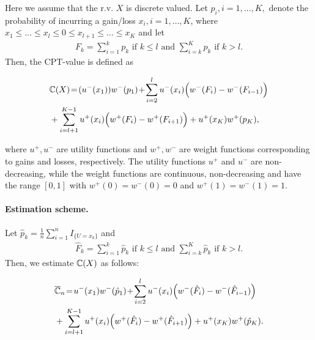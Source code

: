 Here we assume that the r.v. $X$ is discrete valued. 
Let $p_i, i=1,\ldots,K,$ denote the probability of incurring a gain/loss $x_i, i=1,\ldots,K$, where 
$x_1\le \ldots \le x_l \le 0 \le x_{l+1} \le \ldots \le x_K$ and  let
\begin{align}
\label{eq:Fk}
 F_k = 
   \sum_{i=1}^k p_k  \text{ if   } k \leq l \text{ and }
   \sum_{i=k}^K p_k  \text{ if  }  k > l.
\end{align}
Then, the CPT-value is defined as 
\begin{small}
\begin{align*}
&\mathbb{C}(X) \!=\! (u^-(x_1)) w^-(p_1) 
\!+\!\sum_{i=2}^l u^-(x_i) \Big(w^-(F_i) - w^-(F_{i-1})\Big) \\
& + \sum_{i=l+1}^{K-1} u^+(x_i) \Big(w^+(F_i) - w^+(F_{i+1}) \Big)
 + u^+(x_K) w^+(p_K),
\end{align*} 
\end{small}
where $u^+, u^-$ are utility functions and $w^+, w^-$ are weight functions corresponding to gains and losses, respectively. The utility functions $u^+$ and $u^-$ are non-decreasing, while the weight functions are continuous, non-decreasing and have the range $[0,1]$ with $w^+(0)=w^-(0)=0$ and $w^+(1)=w^-(1)=1$. 

\paragraph{Estimation scheme.} 
Let $\hat p_k= \frac{1}{n} \sum_{i=1}^n I_{\{U =x_k\}}$ and 
\begin{align}
\label{eq:Fkhat}
 \hat F_k = 
   \sum_{i=1}^k \hat p_k  \text{ if   } k \leq l \text{ and }
   \sum_{i=k}^K \hat p_k  \text{ if  }  k > l.
\end{align}
Then, we estimate $\mathbb{C}(X)$ as follows:
\begin{small}
\begin{align*}
&\overline {\mathbb{C}}_n \!=\! 
u^-(x_1) w^-(\hat p_1) \!+\!\sum_{i=2}^l u^-(x_i) \Big(w^-(\hat F_i) - w^-( \hat F_{i-1})\Big) 
\nonumber\\
&
+ \sum_{i=l+1}^{K-1} u^+(x_i) \Big(w^+(\hat F_i) - w^+(\hat F_{i+1}) \Big) + u^+(x_K) w^+(\hat p_K). 
\end{align*}
\end{small}

